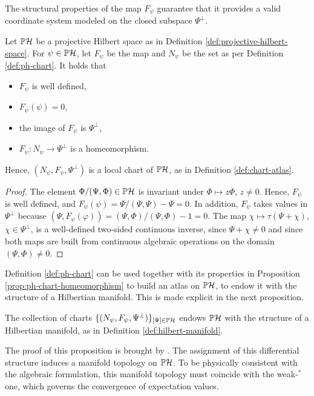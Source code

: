 \noindent The structural properties of the map $F_\psi$ guarantee that it provides a valid coordinate system modeled on the closed subspace $\Psi^\perp$.

\begin{proposition}
	\label{prop:ph-chart-homeomorphism}
	Let $\PH$ be a projective Hilbert space as in Definition \ref{def:projective-hilbert-space}. For $\psi\in\PH$, let $F_\psi$ be the map and $N_\psi$ be the set as per Definition \ref{def:ph-chart}.  It holds that
	\begin{itemize}
		\item $F_\psi$ is well defined,
		\item $F_\psi(\psi)=0$,
		\item the image of $F_\psi$ is $\Psi^\perp$,
		\item $F_\psi:N_\psi\to\Psi^\perp$ is a homeomorphism.
	\end{itemize}
	Hence, $(N_\psi,F_\psi,\Psi^\perp)$ is a local chart of $\PH$, as in Definition \ref{def:chart-atlas}.
\end{proposition}

\begin{proof}
	The element $\Phi/(\Psi,\Phi) \in \PH$ is invariant under $\Phi\mapsto z\Phi$, $z\neq0$. Hence,
	$F_\psi$ is well defined, and $F_\psi(\psi)=\Psi/(\Psi,\Psi)-\Psi=0$.
	In addition, $F_\psi$ takes values in $\Psi^\perp$ because $(\Psi,F_\psi(\varphi))=(\Psi,\Phi)/(\Psi,\Phi)-1=0$. The map
	$\chi\mapsto\tau(\Psi+\chi)$, $\chi\in\Psi^\perp$, is a well-defined
	two-sided continuous inverse, since $\Psi+\chi\neq0$ and since both maps are
	built from continuous algebraic operations on the domain
	$(\Psi,\Phi)\neq0$.
\end{proof}

 Definition \ref{def:ph-chart} can be used together with its properties in Proposition \ref{prop:ph-chart-homeomorphism} to build an atlas on $\PH$, to endow it with the structure of a Hilbertian manifold. This is made explicit in the next proposition.

\begin{proposition}
	\label{prop:ph-atlas}
	The collection of charts $\{(N_\psi,F_\psi,\Psi^\perp)\}_{[\Psi]\in\PH}$
	endows $\PH$ with the structure of a Hilbertian manifold, as in Definition \ref{def:hilbert-manifold}.
\end{proposition}

The proof of this proposition is brought by \cite[Section 2.5]{landsmanMathematicalTopicsClassical1998}. The assignment of this differential structure induces a manifold topology on $\PH$. To be physically consistent with the algebraic formulation, this manifold topology must coincide with the weak-$^*$ one, which governs the convergence of expectation values.

